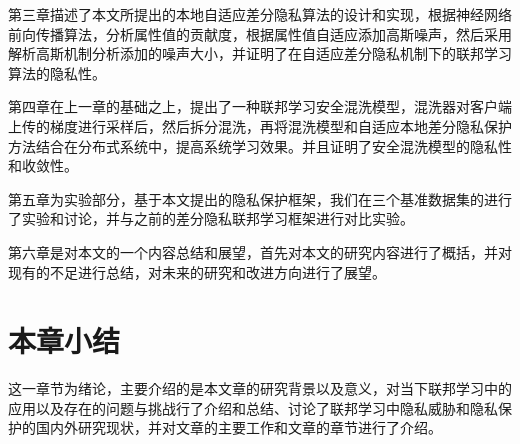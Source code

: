 第三章描述了本文所提出的本地自适应差分隐私算法的设计和实现，根据神经网络前向传播算法，分析属性值的贡献度，根据属性值自适应添加高斯噪声，然后采用解析高斯机制分析添加的噪声大小，并证明了在自适应差分隐私机制下的联邦学习算法的隐私性。
  
第四章在上一章的基础之上，提出了一种联邦学习安全混洗模型，混洗器对客户端上传的梯度进行采样后，然后拆分混洗，再将混洗模型和自适应本地差分隐私保护方法结合在分布式系统中，提高系统学习效果。并且证明了安全混洗模型的隐私性和收敛性。
    
第五章为实验部分，基于本文提出的隐私保护框架，我们在三个基准数据集的进行了实验和讨论，并与之前的差分隐私联邦学习框架进行对比实验。

第六章是对本文的一个内容总结和展望，首先对本文的研究内容进行了概括，并对现有的不足进行总结，对未来的研究和改进方向进行了展望。

\section{本章小结}
这一章节为绪论，主要介绍的是本文章的研究背景以及意义，对当下联邦学习中的应用以及存在的问题与挑战行了介绍和总结、讨论了联邦学习中隐私威胁和隐私保护的国内外研究现状，并对文章的主要工作和文章的章节进行了介绍。

